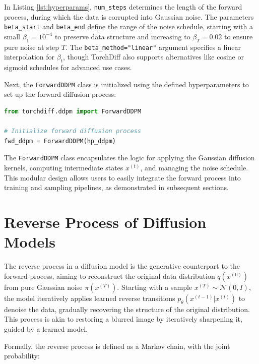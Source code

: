 \documentclass[12pt]{article}
\begin{document}
In Listing \ref{lst:hyperparams}, \texttt{num\_steps} determines the length of the forward process, during which the data is corrupted into Gaussian noise. The parameters \texttt{beta\_start} and \texttt{beta\_end} define the range of the noise schedule, starting with a small \( \beta_1 = 10^{-4} \) to preserve data structure and increasing to \( \beta_T = 0.02 \) to ensure pure noise at step \( T \). The \texttt{beta\_method="linear"} argument specifies a linear interpolation for \( \beta_t \), though TorchDiff also supports alternatives like cosine or sigmoid schedules for advanced use cases.

Next, the \texttt{ForwardDDPM} class is initialized using the defined hyperparameters to set up the forward diffusion process:

\begin{lstlisting}[language=Python, caption={Initializing the forward process in TorchDiff.}, label={lst:forward_ddpm}]
from torchdiff.ddpm import ForwardDDPM

# Initialize forward diffusion process
fwd_ddpm = ForwardDDPM(hp_ddpm)
\end{lstlisting}

The \texttt{ForwardDDPM} class encapsulates the logic for applying the Gaussian diffusion kernels, computing intermediate states \( x^{(t)} \), and managing the noise schedule. This modular design allows users to easily integrate the forward process into training and sampling pipelines, as demonstrated in subsequent sections.




\section{Reverse Process of Diffusion Models}
\label{sec:reverse}

The reverse process in a diffusion model is the generative counterpart to the forward process, aiming to reconstruct the original data distribution \( q(x^{(0)}) \) from pure Gaussian noise \( \pi(x^{(T)}) \). Starting with a sample \( x^{(T)} \sim \mathcal{N}(0, I) \), the model iteratively applies learned reverse transitions \( p_\theta(x^{(t-1)} | x^{(t)}) \) to denoise the data, gradually recovering the structure of the original distribution. This process is akin to restoring a blurred image by iteratively sharpening it, guided by a learned model.

Formally, the reverse process is defined as a Markov chain, with the joint probability:
\end{document}

